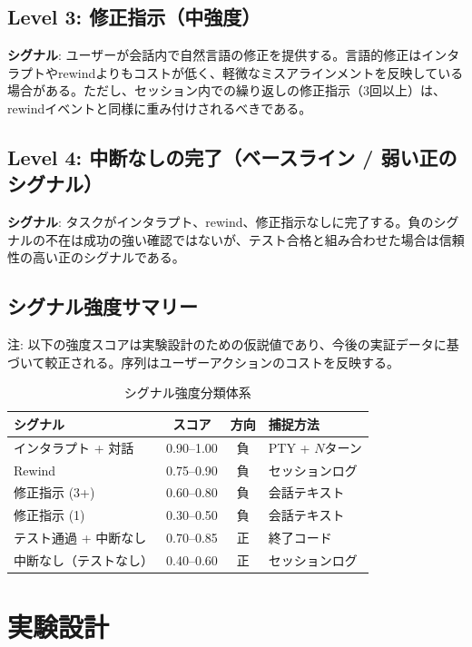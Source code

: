\documentclass[conference]{IEEEtran}
\begin{document}
\subsection{Level 3: 修正指示（中強度）}

\textbf{シグナル}: ユーザーが会話内で自然言語の修正を提供する。言語的修正はインタラプトやrewindよりもコストが低く、軽微なミスアラインメントを反映している場合がある。ただし、セッション内での繰り返しの修正指示（3回以上）は、rewindイベントと同様に重み付けされるべきである。

\subsection{Level 4: 中断なしの完了（ベースライン / 弱い正のシグナル）}

\textbf{シグナル}: タスクがインタラプト、rewind、修正指示なしに完了する。負のシグナルの不在は成功の強い確認ではないが、テスト合格と組み合わせた場合は信頼性の高い正のシグナルである。

\subsection{シグナル強度サマリー}

注: 以下の強度スコアは実験設計のための仮説値であり、今後の実証データに基づいて較正される。序列はユーザーアクションのコストを反映する。

\begin{table}[h]
\centering
\caption{シグナル強度分類体系}
\label{tab:signals}
\small
\begin{tabular}{p{3.0cm}ccp{1.8cm}}
\toprule
\textbf{シグナル} & \textbf{スコア} & \textbf{方向} & \textbf{捕捉方法} \\
\midrule
インタラプト + 対話 & 0.90--1.00 & 負 & PTY + $N$ターン \\
Rewind & 0.75--0.90 & 負 & セッションログ \\
修正指示 (3+) & 0.60--0.80 & 負 & 会話テキスト \\
修正指示 (1) & 0.30--0.50 & 負 & 会話テキスト \\
テスト通過 + 中断なし & 0.70--0.85 & 正 & 終了コード \\
中断なし（テストなし） & 0.40--0.60 & 正 & セッションログ \\
\bottomrule
\end{tabular}
\end{table}

\section{実験設計}
\end{document}
